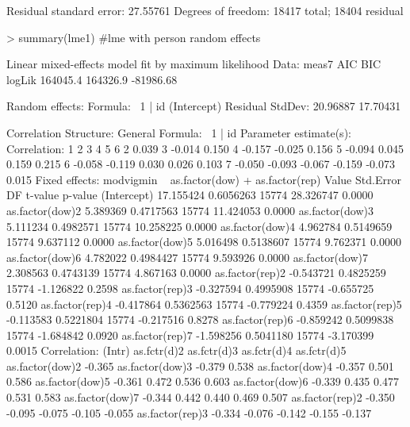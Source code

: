 \documentclass[11pt]{article}
\begin{document}
\begin{Schunk}
\begin{Soutput}
Residual standard error: 27.55761 
Degrees of freedom: 18417 total; 18404 residual
\end{Soutput}
\begin{Sinput}
> summary(lme1) #lme with person random effects
\end{Sinput}
\begin{Soutput}
Linear mixed-effects model fit by maximum likelihood
 Data: meas7 
       AIC      BIC    logLik
  164045.4 164326.9 -81986.68

Random effects:
 Formula: ~1 | id
        (Intercept) Residual
StdDev:    20.96887 17.70431

Correlation Structure: General
 Formula: ~1 | id 
 Parameter estimate(s):
 Correlation: 
  1      2      3      4      5      6     
2  0.039                                   
3 -0.014  0.150                            
4 -0.157 -0.025  0.156                     
5 -0.094  0.045  0.159  0.215              
6 -0.058 -0.119  0.030  0.026  0.103       
7 -0.050 -0.093 -0.067 -0.159 -0.073  0.015
Fixed effects: modvigmin ~ as.factor(dow) + as.factor(rep) 
                    Value Std.Error    DF   t-value p-value
(Intercept)     17.155424 0.6056263 15774 28.326747  0.0000
as.factor(dow)2  5.389369 0.4717563 15774 11.424053  0.0000
as.factor(dow)3  5.111234 0.4982571 15774 10.258225  0.0000
as.factor(dow)4  4.962784 0.5149659 15774  9.637112  0.0000
as.factor(dow)5  5.016498 0.5138607 15774  9.762371  0.0000
as.factor(dow)6  4.782022 0.4984427 15774  9.593926  0.0000
as.factor(dow)7  2.308563 0.4743139 15774  4.867163  0.0000
as.factor(rep)2 -0.543721 0.4825259 15774 -1.126822  0.2598
as.factor(rep)3 -0.327594 0.4995908 15774 -0.655725  0.5120
as.factor(rep)4 -0.417864 0.5362563 15774 -0.779224  0.4359
as.factor(rep)5 -0.113583 0.5221804 15774 -0.217516  0.8278
as.factor(rep)6 -0.859242 0.5099838 15774 -1.684842  0.0920
as.factor(rep)7 -1.598256 0.5041180 15774 -3.170399  0.0015
 Correlation: 
                (Intr) as.fctr(d)2 as.fctr(d)3 as.fctr(d)4 as.fctr(d)5
as.factor(dow)2 -0.365                                                
as.factor(dow)3 -0.379  0.538                                         
as.factor(dow)4 -0.357  0.501       0.586                             
as.factor(dow)5 -0.361  0.472       0.536       0.603                 
as.factor(dow)6 -0.339  0.435       0.477       0.531       0.583     
as.factor(dow)7 -0.344  0.442       0.440       0.469       0.507     
as.factor(rep)2 -0.350 -0.095      -0.075      -0.105      -0.055     
as.factor(rep)3 -0.334 -0.076      -0.142      -0.155      -0.137     

\end{Soutput}
\end{Schunk}
\end{document}
